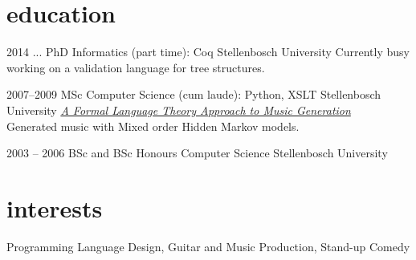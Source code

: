 \documentclass[print]{friggeri-cv-a4} %
\begin{document}
\section{education}

\begin{entrylist}

\entry
{2014 ...}
{PhD {\normalfont Informatics} (part time): {\normalfont Coq}}
{Stellenbosch University}
{Currently busy working on a validation language for tree structures.}

\entry
{2007--2009}
{MSc {\normalfont Computer Science} (cum laude): {\normalfont Python, XSLT}}
{Stellenbosch University}
{\href{http://superwillow.sourceforge.net/}{\emph{A Formal Language Theory Approach to Music Generation}} \\ Generated music with Mixed order Hidden Markov models.}

\entry
{2003 -- 2006}
{BSc and BSc Honours {\normalfont Computer Science}}
{Stellenbosch University}
{}

\end{entrylist}

\section{interests}

Programming Language Design, Guitar and Music Production, Stand-up Comedy
\end{document}
